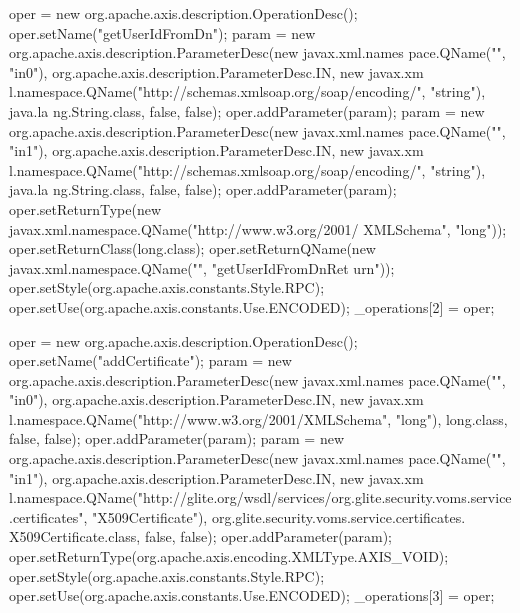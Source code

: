 \begin{DoxyCode}
{        oper = new org.apache.axis.description.OperationDesc();
        oper.setName("getUserIdFromDn");
        param = new org.apache.axis.description.ParameterDesc(new javax.xml.names
      pace.QName("", "in0"), org.apache.axis.description.ParameterDesc.IN, new javax.xm
      l.namespace.QName("http://schemas.xmlsoap.org/soap/encoding/", "string"), java.la
      ng.String.class, false, false);
        oper.addParameter(param);
        param = new org.apache.axis.description.ParameterDesc(new javax.xml.names
      pace.QName("", "in1"), org.apache.axis.description.ParameterDesc.IN, new javax.xm
      l.namespace.QName("http://schemas.xmlsoap.org/soap/encoding/", "string"), java.la
      ng.String.class, false, false);
        oper.addParameter(param);
        oper.setReturnType(new javax.xml.namespace.QName("http://www.w3.org/2001/
      XMLSchema", "long"));
        oper.setReturnClass(long.class);
        oper.setReturnQName(new javax.xml.namespace.QName("", "getUserIdFromDnRet
      urn"));
        oper.setStyle(org.apache.axis.constants.Style.RPC);
        oper.setUse(org.apache.axis.constants.Use.ENCODED);
        _operations[2] = oper;

        oper = new org.apache.axis.description.OperationDesc();
        oper.setName("addCertificate");
        param = new org.apache.axis.description.ParameterDesc(new javax.xml.names
      pace.QName("", "in0"), org.apache.axis.description.ParameterDesc.IN, new javax.xm
      l.namespace.QName("http://www.w3.org/2001/XMLSchema", "long"), long.class, false,
       false);
        oper.addParameter(param);
        param = new org.apache.axis.description.ParameterDesc(new javax.xml.names
      pace.QName("", "in1"), org.apache.axis.description.ParameterDesc.IN, new javax.xm
      l.namespace.QName("http://glite.org/wsdl/services/org.glite.security.voms.service
      .certificates", "X509Certificate"), org.glite.security.voms.service.certificates.
      X509Certificate.class, false, false);
        oper.addParameter(param);
        oper.setReturnType(org.apache.axis.encoding.XMLType.AXIS_VOID);
        oper.setStyle(org.apache.axis.constants.Style.RPC);
        oper.setUse(org.apache.axis.constants.Use.ENCODED);
        _operations[3] = oper;

}
\end{DoxyCode}
